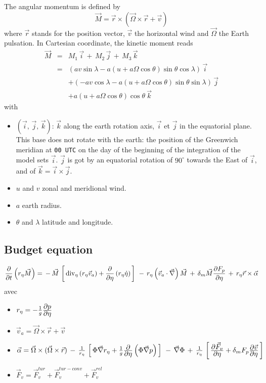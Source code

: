 The angular momentum is defined by
\begin{displaymath} 
        \vec{M}=\vec{r}\times(\vec{\Omega}\times\vec{r}+\vec{v})
\end{displaymath}
where $\vec{r}$ stands for the position vector, $\vec{v}$  the horizontal wind and $\vec{\Omega}$ the Earth pulsation. In Cartesian coordinate, the kinetic moment reads
\begin{eqnarray*} 
        \vec{M} & = & M_1 \, \vec{i}\, + \, M_2\, \vec{j}\, + \, M_3 \,\vec{k}\\
        & = & ( a v \sin \lambda - a ( u + a \Omega \cos\theta ) \sin \theta \cos \lambda ) \, \vec{i}  \\
        &   & + ( - a v \cos \lambda - a ( u + a \Omega \cos \theta ) \sin \theta \sin \lambda ) \,\vec{j}  \\
        &   & + a ( u + a \Omega \cos \theta ) \cos \theta \: \vec{k}
\end{eqnarray*}
with
\begin{itemize}
        \item $(\vec{i},\,\vec{j},\,\vec{k})$:  $\vec{k}$ along the earth rotation axis, $\vec{i}$ et $\vec{j}$ in the equatorial plane. This base does not rotate with the earth: the position of the Greenwich meridian at {\tt 00 UTC} on the day of the beginning of the integration of the model sets $\vec{i}$. $\vec{j}$ is got by an equatorial rotation of $90^\circ$ towards the East of $\vec{i}$, and of $\vec{k}=\vec{i}\times\vec{j}$.

        \item $u$ and $v$ zonal and meridional wind.
        \item $a$ earth radius.
        \item $\theta$ and $\lambda$ latitude and longitude.
\end{itemize}
\subsection*{Budget equation}
$$ 
\frac{\displaystyle \partial }{\displaystyle \partial t}\left(r_{\eta}\vec{M}\right)
=
\, -\, \vec{M}\, \left[ \,\mathop{\rm div}\nolimits_{\eta}\left(r_{\eta}\vec{v}_{a}\right)+\frac{\displaystyle \partial }{\displaystyle \partial \eta}\left(r_{\eta}\dot{\eta}\right)\, \right] \,
\, -\, r_{\eta}\left(\vec{v}_{a}\cdot\vec{\nabla}\right)\vec{M}
\, +\, \delta_m \vec{M}\frac{\displaystyle \partial F_p}{\displaystyle \partial \eta}
\, +\, r_{\eta}\vec{r}\times\vec{\alpha}
$$
avec
\begin{itemize}
        \item $r_{\eta}=-\frac{1}{g}\frac{\displaystyle \partial p}{\displaystyle \partial \eta}$
        \item $\vec{v}_{a}=\vec{\Omega}\times\vec{r}+\vec{v}$
        \item $\vec{\alpha}=\vec{\Omega}\times(\vec{\Omega}\times\vec{r})
              \, -\, \frac{1}{r_{\eta}}\, \left[ \, \Phi\vec{\nabla}r_{\eta}+\frac{1}{g}\frac{\displaystyle \partial }{\displaystyle \partial \eta}\left(\Phi\vec{\nabla} p\right)\, \right] \,
              \, -\, \vec{\nabla}\Phi
              \, +\, \frac{1}{r_{\eta}}\, \left[ \,\frac{\displaystyle \partial \vec{F}_{v}}{\displaystyle \partial \eta}+\delta_m F_p \frac{\displaystyle \partial \vec{v}}{\displaystyle \partial \eta}\, \right] \,$
        \item $\vec{F}_v=\vec{F}_v^{tur}+\vec{F}_v^{tur-conv}+\vec{F}_v^{rel}$
\end{itemize}
